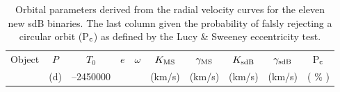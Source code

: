 \begin{table}
 \setlength\tabcolsep{1.5mm}
   \centering
   \caption{Orbital parameters derived from the radial velocity curves for the eleven new sdB binaries. The last column given the probability of falsly rejecting a circular orbit (P$_{\rm c}$) as defined by the Lucy \& Sweeney eccentricity test.} \label{tb:orbital_parameters}
   \begin{tabular}{lr@{ $\pm$ }lr@{ $\pm$ }lr@{ $\pm$ }lr@{ $\pm$ }lr@{ $\pm$ }lr@{ $\pm$ }lr@{ $\pm$ }lr@{ $\pm$ }lr}
    \hline   
    Object   &   \multicolumn{2}{c}{$P$}   &   \multicolumn{2}{c}{$T_0$}   &   \multicolumn{2}{c}{$e$}   &   \multicolumn{2}{c}{$\omega$}   &   \multicolumn{2}{c}{$K_{\rm{MS}}$}   &   \multicolumn{2}{c}{$\gamma_{\rm{MS}}$}   &   \multicolumn{2}{c}{$K_{\rm{sdB}}$}   &   \multicolumn{2}{c}{$\gamma_{\rm{sdB}}$}   &   \multicolumn{1}{c}{P$_{\rm c}$} \\
             &   \multicolumn{2}{c}{(d)}   &   \multicolumn{2}{c}{--2450000}   &   \multicolumn{2}{c}{}   &   \multicolumn{2}{c}{}   &   \multicolumn{2}{c}{(km/s)}   &   \multicolumn{2}{c}{(km/s)}  
             &   \multicolumn{2}{c}{(km/s)}   &   \multicolumn{2}{c}{(km/s)}  &  \multicolumn{1}{c}{( \% )} \\\hline \hline
    

\end{tabular}
\end{table}

